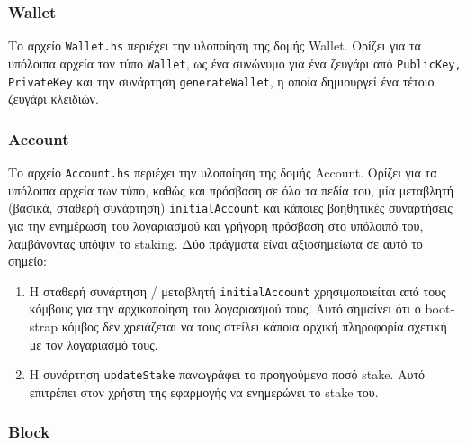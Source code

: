 \documentclass{article}
\newcommand{\eng}[1]{\foreignlanguage{english}{#1}} %
\begin{document}
\subsubsection{\eng{Wallet}}

Το αρχείο \texttt{\eng{Wallet.hs}} περιέχει την υλοποίηση της δομής \eng{Wallet}.
Ορίζει για τα υπόλοιπα αρχεία τον τύπο \texttt{\eng{Wallet}}, ως ένα συνώνυμο
για ένα ζευγάρι από \texttt{\eng{PublicKey, PrivateKey}} και την συνάρτηση
\texttt{\eng{generateWallet}}, η οποία δημιουργεί ένα τέτοιο ζευγάρι κλειδιών.

\begin{figure}[ht]
    
\end{figure}
\FloatBarrier

\subsubsection{\eng{Account}}

Το αρχείο \texttt{\eng{Account.hs}} περιέχει την υλοποίηση της δομής \eng{Account}.
Ορίζει για τα υπόλοιπα αρχεία των τύπο, καθώς και πρόσβαση σε όλα τα πεδία του,
μία μεταβλητή (βασικά, σταθερή συνάρτηση) \texttt{\eng{initialAccount}} και κάποιες
βοηθητικές συναρτήσεις για την ενημέρωση του λογαριασμού και γρήγορη πρόσβαση στο
υπόλοιπό του, λαμβάνοντας υπόψιν το \eng{staking}. Δύο πράγματα είναι αξιοσημείωτα
σε αυτό το σημείο:

\begin{enumerate}
    \item Η σταθερή συνάρτηση / μεταβλητή \texttt{\eng{initialAccount}} χρησιμοποιείται
        από τους κόμβους για την αρχικοποίηση του λογαριασμού τους. Αυτό σημαίνει ότι
        ο \eng{bootstrap} κόμβος δεν χρειάζεται να τους στείλει κάποια αρχική πληροφορία
        σχετική με τον λογαριασμό τους.
    \item Η συνάρτηση \texttt{\eng{updateStake}} πανωγράφει το προηγούμενο ποσό
        \eng{stake}. Αυτό επιτρέπει στον χρήστη της εφαρμογής να ενημερώνει το
        \eng{stake} του.
\end{enumerate}

    

\subsubsection{\eng{Block}}
\end{document}
